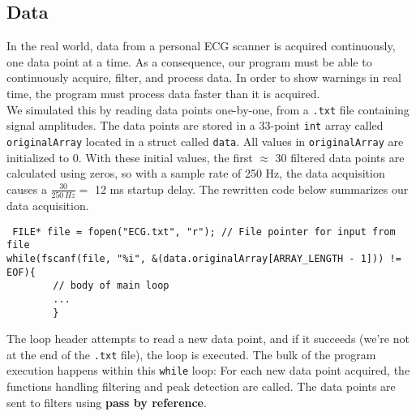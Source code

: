 \subsection{Data}
In the real world, data from a personal ECG scanner is acquired continuously, one data point at a time. As a consequence, our program must be able to continuously acquire, filter, and process data. In order to show warnings in real time, the program must process data faster than it is acquired. \\ We simulated this by reading data points one-by-one, from a \texttt{.txt} file containing signal amplitudes. The data points are stored in a 33-point \color{blue} \texttt{int} \color{black} array called \texttt{originalArray} located in a struct called \texttt{data}. All values in \texttt{originalArray} are initialized to 0. With these initial values, the first $\approx$ 30 filtered data points are calculated using zeros, so with a sample rate of 250 Hz, the data acquisition causes a $\frac{30}{250 \, \si{Hz}} =$ 12 ms startup delay. The rewritten code below summarizes our data acquisition.


\begin{lstlisting}
 FILE* file = fopen("ECG.txt", "r"); // File pointer for input from file
while(fscanf(file, "%i", &(data.originalArray[ARRAY_LENGTH - 1])) != EOF){
        // body of main loop
        ...
        }
\end{lstlisting}

The loop header attempts to read a new data point, and if it succeeds (we're not at the end of the \texttt{.txt} file), the loop is executed. The bulk of the program execution happens within this \color{blue} \texttt{while} \color{black} loop: For each new data point acquired, the functions handling filtering and peak detection are called. The data points are sent to filters using \textbf{pass by reference}.


